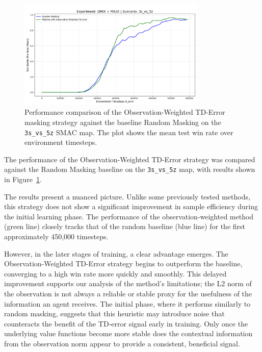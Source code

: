 \begin{figure}[H]
    \centering
    \includegraphics[width=0.8\textwidth]{images_pfe/results_li-ma2e/test_battle_won_mean_3s_vs_5z_Observation-Weighted_TD_smoothed.png}
    \caption{Performance comparison of the Observation-Weighted TD-Error masking strategy against the baseline Random Masking on the \texttt{3s\_vs\_5z} SMAC map. The plot shows the mean test win rate over environment timesteps.}
    \label{fig:obs_weighted_vs_random}
\end{figure}

The performance of the Observation-Weighted TD-Error strategy was compared against the Random Masking baseline on the \texttt{3s\_vs\_5z} map, with results shown in Figure~\ref{fig:obs_weighted_vs_random}.

The results present a nuanced picture. Unlike some previously tested methods, this strategy does not show a significant improvement in sample efficiency during the initial learning phase. The performance of the observation-weighted method (green line) closely tracks that of the random baseline (blue line) for the first approximately 450,000 timesteps.

However, in the later stages of training, a clear advantage emerges. The Observation-Weighted TD-Error strategy begins to outperform the baseline, converging to a high win rate more quickly and smoothly. This delayed improvement supports our analysis of the method's limitations; the L2 norm of the observation is not always a reliable or stable proxy for the usefulness of the information an agent receives. The initial phase, where it performs similarly to random masking, suggests that this heuristic may introduce noise that counteracts the benefit of the TD-error signal early in training. Only once the underlying value functions become more stable does the contextual information from the observation norm appear to provide a consistent, beneficial signal.
